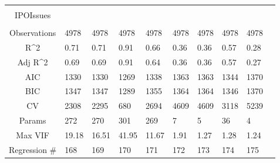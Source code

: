 \documentclass{article}
\begin{document}
\begin{table}[H]
\begin{tabular}{|clllllllll|}
   &  &  &  &  &  &  &  &  & \\ 
  IPOIssues &  &  &  &  &  &  &  &  & \\ 
   &  &  &  &  &  &  &  &  & \\ 
  \hline 
 Observations & 4978 & 4978 & 4978 & 4978 & 4978 & 4978 & 4978 & 4978 & \\ 
  R^2 & 0.71 & 0.71 & 0.91 & 0.66 & 0.36 & 0.36 & 0.57 & 0.28 & \\ 
  Adj R^2 & 0.69 & 0.69 & 0.91 & 0.64 & 0.36 & 0.36 & 0.57 & 0.27 & \\ 
  AIC & 1330 & 1330 & 1269 & 1338 & 1363 & 1363 & 1344 & 1370 & \\ 
  BIC & 1347 & 1347 & 1289 & 1355 & 1364 & 1364 & 1346 & 1370 & \\ 
  CV & 2308 & 2295 & 680 & 2694 & 4609 & 4609 & 3118 & 5239 & \\ 
  Params & 272 & 270 & 301 & 269 & 7 & 5 & 36 & 4 & \\ 
  Max VIF & 19.18 & 16.51 & 41.95 & 11.67 & 1.91 & 1.27 & 1.28 & 1.24 & \\ 
  Regression \# & 168 & 169 & 170 & 171 & 172 & 173 & 174 & 175 & \\ 
   \hline
\end{tabular}
 
\end{table}
\end{document}
